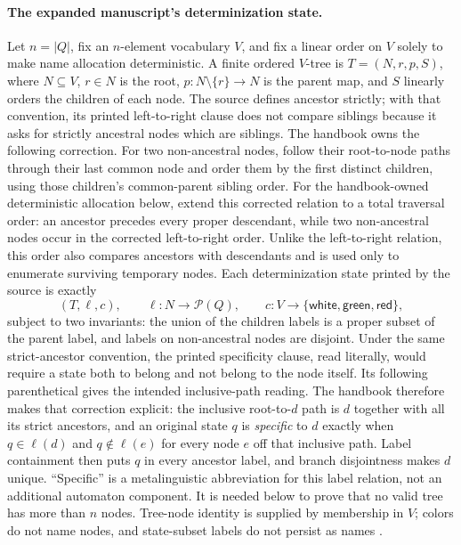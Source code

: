 \paragraph{The expanded manuscript's determinization state.}
\label{sec:p09-safra-determinization}
Let \(n=|Q|\), fix an \(n\)-element vocabulary \(V\), and fix a linear order on
\(V\) solely to make name allocation deterministic.  A finite ordered
\(V\)-tree is \(T=(N,r,p,S)\), where \(N\subseteq V\), \(r\in N\) is the
root, \(p:N\setminus\{r\}\to N\) is the parent map, and \(S\) linearly orders
the children of each node.  The source defines ancestor strictly; with that
convention, its printed left-to-right clause does not compare siblings because
it asks for strictly ancestral nodes which are siblings.  The handbook owns the
following correction.  For two non-ancestral nodes, follow their root-to-node
paths through their last common node and order them by the first distinct
children, using those children's common-parent sibling order.  For the
handbook-owned deterministic allocation below, extend this corrected relation
to a total traversal order: an ancestor precedes every proper descendant, while
two non-ancestral nodes occur in the corrected left-to-right order.  Unlike the
left-to-right relation, this order also compares ancestors with descendants and
is used only to enumerate surviving temporary nodes.  Each determinization
state printed by the source is exactly
\[
  (T,\ell,c),
  \qquad
  \ell:N\longrightarrow\mathcal P(Q),
  \qquad
  c:V\longrightarrow\{\mathsf{white},\mathsf{green},\mathsf{red}\},
\]
subject to two invariants: the union of the children labels is a proper subset
of the parent label, and labels on non-ancestral nodes are disjoint.  Under the
same strict-ancestor convention, the printed specificity clause, read
literally, would require a state both to belong and not belong to the node
itself.  Its following parenthetical gives the intended inclusive-path
reading.  The handbook therefore makes that correction explicit: the inclusive
root-to-\(d\) path is \(d\) together with all its strict ancestors, and an
original state \(q\) is \emph{specific} to \(d\) exactly when
\(q\in\ell(d)\) and \(q\notin\ell(e)\) for every node \(e\) off that inclusive
path.  Label containment then puts \(q\) in every ancestor label, and branch
disjointness makes \(d\) unique.  ``Specific'' is a metalinguistic
abbreviation for this label relation, not an additional automaton component.
It is needed below to prove that no valid tree has more than \(n\) nodes.  Tree-node
identity is supplied by membership in \(V\); colors do not name nodes, and
state-subset labels do not persist as names
\cite[pp.~9--10]{Safra1995Extended}.

